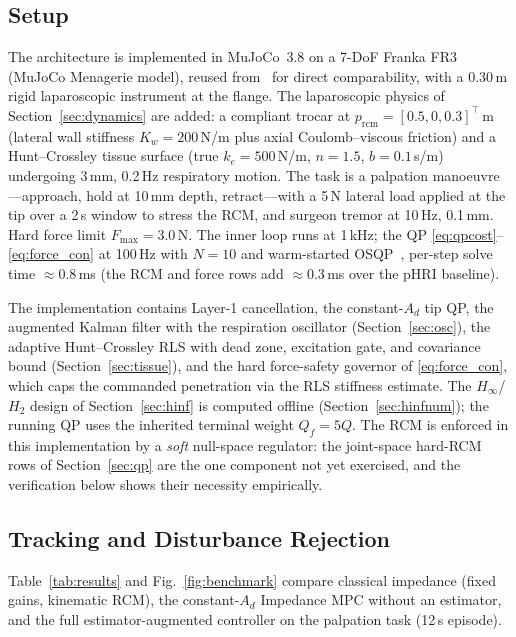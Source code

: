 \subsection{Setup}

The architecture is implemented in MuJoCo~3.8 on a 7-DoF Franka FR3 (MuJoCo Menagerie model), reused from~\cite{cao2026phri} for direct comparability, with a 0.30\,m rigid laparoscopic instrument at the flange. The laparoscopic physics of Section~\ref{sec:dynamics} are added: a compliant trocar at $p_{\text{rcm}} = [0.5, 0, 0.3]^\top$\,m (lateral wall stiffness $K_w = 200$\,N/m plus axial Coulomb--viscous friction) and a Hunt--Crossley tissue surface (true $k_e = 500$\,N/m, $n = 1.5$, $b = 0.1$\,s/m) undergoing 3\,mm, 0.2\,Hz respiratory motion. The task is a palpation manoeuvre---approach, hold at 10\,mm depth, retract---with a 5\,N lateral load applied at the tip over a 2\,s window to stress the RCM, and surgeon tremor at 10\,Hz, 0.1\,mm. Hard force limit $F_{\max} = 3.0$\,N. The inner loop runs at 1\,kHz; the QP \eqref{eq:qpcost}--\eqref{eq:force_con} at 100\,Hz with $N = 10$ and warm-started OSQP~\cite{osqp}, per-step solve time ${\approx}0.8$\,ms (the RCM and force rows add ${\approx}0.3$\,ms over the pHRI baseline).

The implementation contains Layer-1 cancellation, the constant-$A_d$ tip QP, the augmented Kalman filter with the respiration oscillator (Section~\ref{sec:osc}), the adaptive Hunt--Crossley RLS with dead zone, excitation gate, and covariance bound (Section~\ref{sec:tissue}), and the hard force-safety governor of \eqref{eq:force_con}, which caps the commanded penetration via the RLS stiffness estimate. The $H_\infty$/$H_2$ design of Section~\ref{sec:hinf} is computed offline (Section~\ref{sec:hinfnum}); the running QP uses the inherited terminal weight $Q_f=5Q$. The RCM is enforced in this implementation by a \emph{soft} null-space regulator: the joint-space hard-RCM rows of Section~\ref{sec:qp} are the one component not yet exercised, and the verification below shows their necessity empirically.

\subsection{Tracking and Disturbance Rejection}

Table~\ref{tab:results} and Fig.~\ref{fig:benchmark} compare classical impedance (fixed gains, kinematic RCM), the constant-$A_d$ Impedance MPC without an estimator, and the full estimator-augmented controller on the palpation task (12\,s episode).

